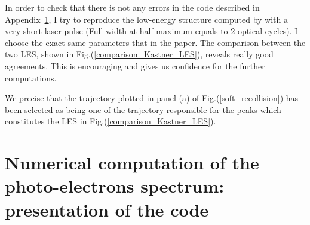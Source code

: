 \documentclass[a4paper]{article}
\begin{document}
In order to check that there is not any errors in the code described in Appendix~\ref{code}, I try to reproduce the low-energy structure computed by \cite{Kastner_2012_pulse} with a very short laser pulse (Full width at half maximum equals to $2$ optical cycles). I choose the exact same parameters that in the paper. The comparison between the two LES, shown in Fig.(\ref{comparison_Kastner_LES}), reveals really good agreements. This is encouraging and gives us confidence for the further computations.
\par
We precise that the trajectory plotted in panel (a) of Fig.(\ref{soft_recollision}) has been selected as being one of the trajectory responsible for the peaks which constitutes the LES in Fig.(\ref{comparison_Kastner_LES}).




\newpage
\appendix

\section{Numerical computation of the photo-electrons spectrum: presentation of the code}
\label{code}
\end{document}
